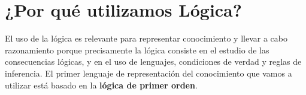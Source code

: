 \documentclass{tufte-handout}
\begin{document}
\section{¿Por qué utilizamos Lógica?}\label{por-que-utilizamos-logica}

El uso de la lógica es relevante para representar conocimiento y llevar
a cabo razonamiento porque precisamente la lógica consiste en el estudio
de las consecuencias lógicas, y en el uso de lenguajes, condiciones de
verdad y reglas de inferencia. El primer lenguaje de representación del
conocimiento que vamos a utilizar está basado en la \textbf{lógica de
primer
orden}.
\end{document}
